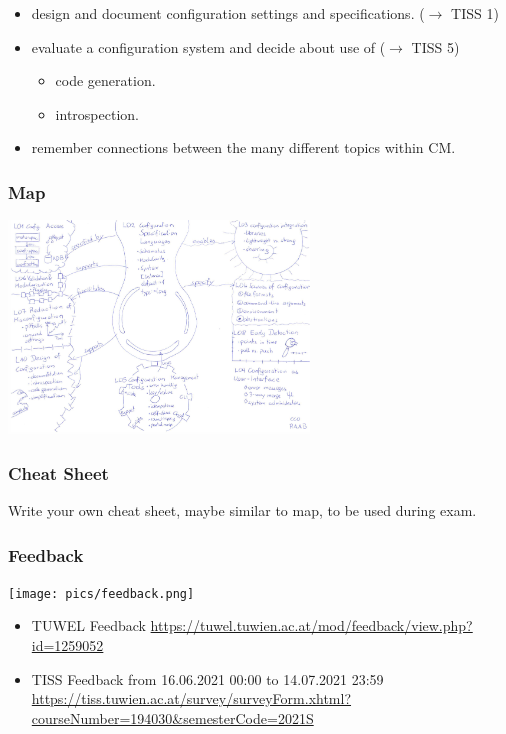 \begin{frame}
\begin{itemize}
	\item design and document configuration settings and specifications.
	($\rightarrow$ TISS 1)
	\item evaluate a configuration system and decide about use of
	($\rightarrow$ TISS 5)
	\begin{itemize}
	\tiny
	\item code generation.
	\item introspection.
	\end{itemize}

	\item remember connections between the many different topics within CM.
	\end{itemize}
\end{frame}

\begin{frame}
	\frametitle{Map}

	\vspace{-0.5cm}
	\includegraphics[width=8cm]{pics/map.pdf}
\end{frame}

\begin{assignment}
	\frametitle{Cheat Sheet}
	\begin{task}
	Write your own cheat sheet, maybe similar to map, to be used during exam.
	\end{task}
\end{assignment}

\begin{frame}
	\frametitle{Feedback}
	\hfill \texttt{[image: pics/feedback.png]}
	\vspace{-1cm}
	\begin{itemize}
		\item TUWEL Feedback \linebreak
		{\scriptsize \url{https://tuwel.tuwien.ac.at/mod/feedback/view.php?id=1259052}}
		\vspace{0.2cm}
		\item TISS Feedback \linebreak
		{\small from 16.06.2021 00:00 to 14.07.2021 23:59
		\scriptsize \url{https://tiss.tuwien.ac.at/survey/surveyForm.xhtml?courseNumber=194030&semesterCode=2021S}}
	\end{itemize}
\end{frame}


